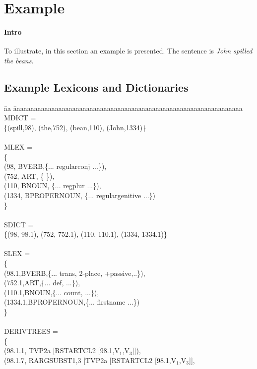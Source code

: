 \section{Example}
\paragraph{Intro}
To illustrate, in this section an example is presented. The sentence is {\em 
John spilled the beans}.

\subsection{Example Lexicons and Dictionaries}

\begin{tabbing}
\= aa \= aaaaaaaaaaaaaaaaaaaaaaaaaaaaaaaaaaaaaaaaaaaaaaaaaaaaaaaaaaaaaaaaaa\kill
\> MDICT =\\
\> \> \{(spill,98), (the,752), (bean,110), (John,1334)\}\\ \\
\> MLEX =\\
\> \> \{\\
\> \> (98, BVERB,\{... regularconj ...\}),\\
\> \> (752, ART, \{ \}),\\
\> \> (110, BNOUN, \{... regplur ...\}),\\
\> \> (1334, BPROPERNOUN, \{... regulargenitive ...\})\\
\> \> \}\\ \\
\> SDICT =\\
\> \> \{(98, 98.1), (752, 752.1), (110, 110.1), (1334, 1334.1)\}\\ \\
\> SLEX =\\
\> \> \{\\
\> \> (98.1,BVERB,\{... trans, 2-place, +passive,..\}),\\
\> \> (752.1,ART,\{... def, ...\}),\\
\> \> (110.1,BNOUN,\{... count, ...\}),\\
\> \> (1334.1,BPROPERNOUN,\{... firstname ...\})\\
\> \> \}\\ \\
\> DERIVTREES =\\
\> \> \{\\
\> \> (98.1.1, TVP2a [RSTARTCL2 [98.1,V$_{1}$,V$_{3}$]]),\\
\> \> (98.1.7, RARGSUBST1,3 [TVP2a [RSTARTCL2 [98.1,V$_{1}$,V$_{3}$]], 

\end{tabbing}
